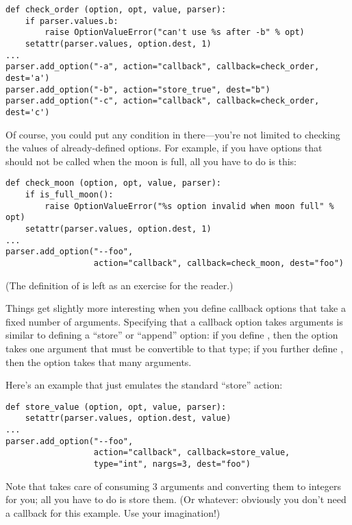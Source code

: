 \begin{verbatim}
def check_order (option, opt, value, parser):
    if parser.values.b:
        raise OptionValueError("can't use %s after -b" % opt)
    setattr(parser.values, option.dest, 1)
...
parser.add_option("-a", action="callback", callback=check_order, dest='a')
parser.add_option("-b", action="store_true", dest="b")
parser.add_option("-c", action="callback", callback=check_order, dest='c')
\end{verbatim}

Of course, you could put any condition in there---you're not limited
to checking the values of already-defined options.  For example, if
you have options that should not be called when the moon is full, all
you have to do is this:

\begin{verbatim}
def check_moon (option, opt, value, parser):
    if is_full_moon():
        raise OptionValueError("%s option invalid when moon full" % opt)
    setattr(parser.values, option.dest, 1)
...
parser.add_option("--foo",
                  action="callback", callback=check_moon, dest="foo")
\end{verbatim}

(The definition of  is left as an exercise for the
reader.)


Things get slightly more interesting when you define callback options
that take a fixed number of arguments.  Specifying that a callback
option takes arguments is similar to defining a ``store'' or
``append'' option: if you define , then the option takes one
argument that must be convertible to that type; if you further define
, then the option takes that many arguments.

Here's an example that just emulates the standard ``store'' action:

\begin{verbatim}
def store_value (option, opt, value, parser):
    setattr(parser.values, option.dest, value)
...
parser.add_option("--foo",
                  action="callback", callback=store_value,
                  type="int", nargs=3, dest="foo")
\end{verbatim}

Note that  takes care of consuming 3 arguments and
converting them to integers for you; all you have to do is store them.
(Or whatever: obviously you don't need a callback for this example.
Use your imagination!)


